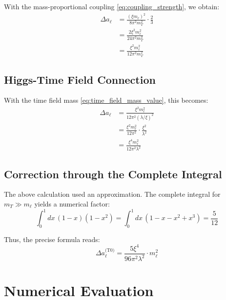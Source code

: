 	With the mass-proportional coupling \eqref{eq:coupling_strength}, we obtain:
	\begin{equation}
		\begin{split}
			\Delta a_\ell &= \frac{(\xi m_\ell)^2}{8\pi^2 m_T^2} \cdot \frac{2}{3} \\
			&= \frac{2 \xi^2 m_\ell^2}{24\pi^2 m_T^2} \\
			&= \frac{\xi^2 m_\ell^2}{12\pi^2 m_T^2}
		\end{split}
		\label{eq:t0_coupling_inserted}
	\end{equation}
	
	\subsection{Higgs-Time Field Connection}
	
	With the time field mass \eqref{eq:time_field_mass_value}, this becomes:
	\begin{equation}
		\begin{split}
			\Delta a_\ell &= \frac{\xi^2 m_\ell^2}{12\pi^2 (\lambda/\xi)^2} \\
			&= \frac{\xi^2 m_\ell^2}{12\pi^2} \cdot \frac{\xi^2}{\lambda^2} \\
			&= \frac{\xi^4 m_\ell^2}{12\pi^2 \lambda^2}
		\end{split}
		\label{eq:higgs_connection_substituted}
	\end{equation}
	
	\subsection{Correction through the Complete Integral}
	
	The above calculation used an approximation. The complete integral for $m_T \gg m_\ell$ yields a numerical factor:
	\begin{equation}
		\int_0^1 dx \, (1-x)(1-x^2) = \int_0^1 dx \, (1-x-x^2+x^3) = \frac{5}{12}
		\label{eq:full_integral}
	\end{equation}
	
	Thus, the precise formula reads:
	\begin{equation}
		\boxed{\Delta a_\ell^{\text{(T0)}} = \frac{5\xi^4}{96\pi^2\lambda^2} \cdot m_\ell^2}
		\label{eq:t0_fundamental_formula}
	\end{equation}
	
	\section{Numerical Evaluation}
	
